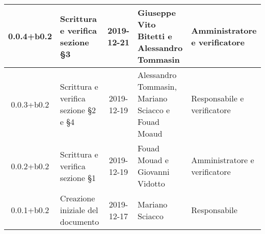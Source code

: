 \begin{center}
\begin{longtable}{|c|p{3.5cm}|c|p{3cm}|p{3cm}|}
	\hline
	0.0.4+b0.2 & Scrittura e verifica sezione \S3 & 2019-12-21 & Giuseppe Vito Bitetti e Alessandro Tommasin & Amministratore e verificatore \\
	\hline 
	0.0.3+b0.2 & Scrittura e verifica sezione \S2 e \S4 & 2019-12-19 & Alessandro Tommasin, Mariano Sciacco e Fouad Moaud & Responsabile e verificatore \\
	\hline 
	0.0.2+b0.2 & Scrittura e verifica sezione \S1 & 2019-12-19 & Fouad Mouad e Giovanni Vidotto & Amministratore e verificatore \\
	\hline 
	0.0.1+b0.2 & Creazione iniziale del documento & 2019-12-17 & Mariano Sciacco & Responsabile \\
	\hline
	

	\end{longtable}
\end{center}